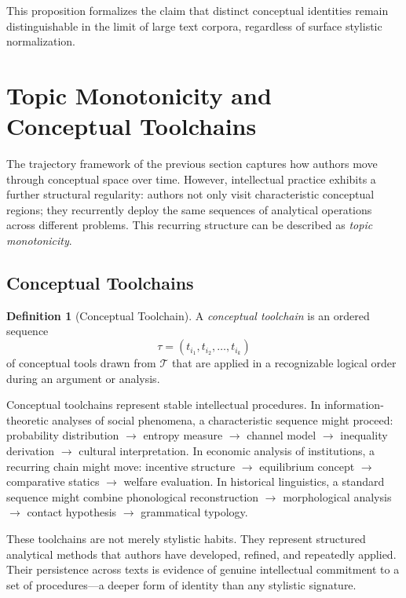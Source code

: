 \documentclass[12pt,a4paper]{article}
\theoremstyle{definition}
\newtheorem{definition}{Definition}[section]
\theoremstyle{plain}
\theoremstyle{remark}
\newcommand{\calT}{\mathcal{T}}
\begin{document}
This proposition formalizes the claim that distinct conceptual identities remain
distinguishable in the limit of large text corpora, regardless of surface stylistic
normalization.

\section{Topic Monotonicity and Conceptual Toolchains}
\label{sec:monotonicity}

The trajectory framework of the previous section captures how authors move through conceptual
space over time. However, intellectual practice exhibits a further structural regularity:
authors not only visit characteristic conceptual regions; they recurrently deploy
the same sequences of analytical operations across different problems.
This recurring structure can be described as \emph{topic monotonicity}.

\subsection{Conceptual Toolchains}

\begin{definition}[Conceptual Toolchain]
A \emph{conceptual toolchain} is an ordered sequence
\[
\tau = (t_{i_1}, t_{i_2}, \ldots, t_{i_k})
\]
of conceptual tools drawn from $\calT$ that are applied in a recognizable logical order
during an argument or analysis.
\end{definition}

Conceptual toolchains represent stable intellectual procedures. In information-theoretic
analyses of social phenomena, a characteristic sequence might proceed: probability
distribution $\to$ entropy measure $\to$ channel model $\to$ inequality derivation $\to$
cultural interpretation. In economic analysis of institutions, a recurring chain might move:
incentive structure $\to$ equilibrium concept $\to$ comparative statics $\to$ welfare
evaluation. In historical linguistics, a standard sequence might combine phonological
reconstruction $\to$ morphological analysis $\to$ contact hypothesis $\to$ grammatical
typology.

These toolchains are not merely stylistic habits. They represent structured analytical
methods that authors have developed, refined, and repeatedly applied. Their persistence
across texts is evidence of genuine intellectual commitment to a set of procedures---a
deeper form of identity than any stylistic signature.
\end{document}
